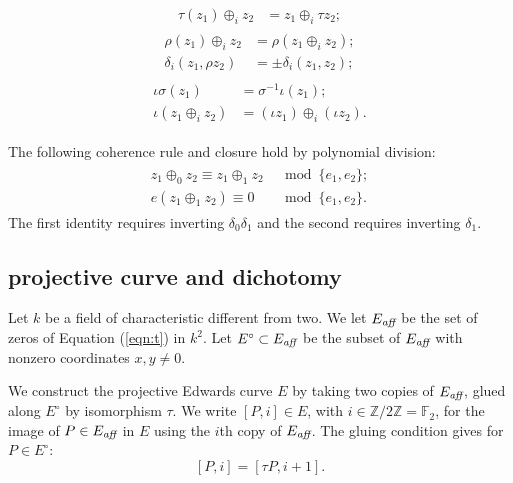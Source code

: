 \documentclass{llncs}
\newcommand{\ring}[1]{\mathbb{#1}}
\newcommand{\op}[1]{\hbox{#1}}
\newcommand{\Eaff}{E_{\op{\scriptsize\it aff}}}
\newcommand{\Eoo}{E^{\circ}} %
\begin{document}
\begin{align}\label{eqn:r-tau}
\tau (z_1)\oplus_i z_2 &= z_1 \oplus_i \tau z_2;
\end{align}
\begin{align}\label{eqn:r-rho}
\begin{split}
\rho(z_1)\oplus_i z_2 &= \rho(z_1\oplus_i z_2);\\
\delta_i(z_1,\rho z_2) &= \pm \delta_i(z_1,z_2);
\end{split}
\end{align}
\begin{align}\label{eqn:r-iota}
\begin{split}
\iota \sigma(z_1) &= \sigma^{-1} \iota (z_1);\\
\iota (z_1\oplus_i z_2) &= (\iota z_1)\oplus_i (\iota z_2).
\end{split}
\end{align}

The following coherence rule and closure hold by polynomial division:
\begin{align}\label{eqn:r-coh}
\begin{split}
z_1 \oplus_0 z_2 \equiv z_1 \oplus_1 z_2 &\mod \{e_1,e_2\};\\
e(z_1\oplus_1 z_2) \equiv 0 &\mod \{e_1,e_2\}.
\end{split}
\end{align}
The first identity requires inverting $\delta_0\delta_1$ and the
second requires inverting $\delta_1$.

\subsection{projective curve and dichotomy}\label{sec:dichot}

Let $k$ be a field of characteristic different from two.  We let
$\Eaff$ be the set of zeros of Equation (\ref{eqn:t}) in $k^2$.  Let
$\Eoo\subset \Eaff$ be the subset of $\Eaff$ with nonzero coordinates
$x,y\ne0$.

We construct the projective Edwards curve $E$ by taking two copies of
$\Eaff$, glued along $\Eoo$ by isomorphism $\tau$.  We write $[P,i]\in
E$, with $i\in \ring{Z}/2\ring{Z}=\ring{F}_2$, for the image of $P\in
\Eaff$ in $E$ using the $i$th copy of $\Eaff$.  The gluing condition
gives for $P\in \Eoo$:
\begin{equation}\label{eqn:glue}
[P,i]=[\tau P,i+1].
\end{equation}
\end{document}

